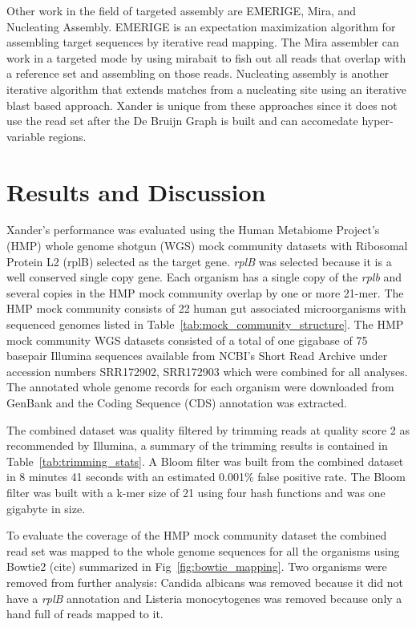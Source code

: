 \documentclass[10pt]{bmc_article}
\newenvironment{bmcformat}{\begin{raggedright}\baselineskip20pt\sloppy\setboolean{publ}{false}}{\end{raggedright}\baselineskip20pt\sloppy}
\begin{document}
\begin{bmcformat}
Other work in the field of targeted assembly are EMERIGE, Mira, and Nucleating Assembly.  EMERIGE is an expectation maximization algorithm for assembling target sequences by iterative read mapping.  The Mira assembler can work in a targeted mode by using mirabait to fish out all reads that overlap with a reference set and assembling on those reads.  Nucleating assembly is another iterative algorithm that extends matches from a nucleating site using an iterative blast based approach.  Xander is unique from these approaches since it does not use the read set after the De Bruijn Graph is built and can accomedate hyper-variable regions.
 
\section*{Results and Discussion}
Xander's performance was evaluated using the Human Metabiome Project's (HMP) whole genome shotgun (WGS) mock community datasets with Ribosomal Protein L2 (rplB) selected as the target gene.  \emph{rplB} was selected because it is a well conserved single copy gene.  Each organism has a single copy of the \emph{rplb} and several copies in the HMP mock community overlap by one or more 21-mer. The HMP mock community consists of 22 human gut associated microorganisms with sequenced genomes listed in Table~\ref{tab:mock_community_structure}.  The HMP mock community WGS datasets consisted of a total of one gigabase of 75 basepair Illumina sequences available from NCBI's Short Read Archive under accession numbers SRR172902, SRR172903 which were combined for all analyses.  The annotated whole genome records for each organism were downloaded from GenBank and the Coding Sequence (CDS) annotation was extracted.

The combined dataset was quality filtered by trimming reads at quality score 2 as recommended by Illumina\cite{Mann2009}, a summary of the trimming results is contained in Table~\ref{tab:trimming_stats}.  A Bloom filter was built from the combined dataset in 8 minutes 41 seconds with an estimated 0.001\% false positive rate.  The Bloom filter was built with a k-mer size of 21 using four hash functions and was one gigabyte in size.

To evaluate the coverage of the HMP mock community dataset the combined read set was mapped to the whole genome sequences for all the organisms using Bowtie2 (cite) summarized in Fig~\ref{fig:bowtie_mapping}.  Two organisms were removed from further analysis: Candida albicans was removed because it did not have a \emph{rplB} annotation and Listeria monocytogenes was removed because only a hand full of reads mapped to it.


\end{bmcformat}
\end{document}
